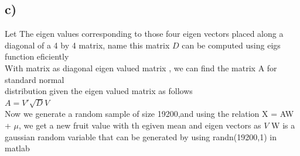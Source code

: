 \documentclass{article}
\begin{document}
\subsection*{c)}
Let The eigen values corresponding to those four eigen vectors placed along a diagonal of a 4 by 4 matrix, name this matrix $D$ can be computed using eigs function eficiently\\
With matrix as diagonal eigen valued matrix , we can find the matrix A for standard normal\\ distribution given the eigen valued matrix as follows\\
$A = V'\sqrt{D}V$ \\
Now we generate a random sample of size 19200,and using the relation X = AW + $\mu$, we get a new fruit value with th egiven mean and eigen vectors as $V$
W is a gaussian random variable that can be generated by using randn(19200,1) in matlab
\end{document}
